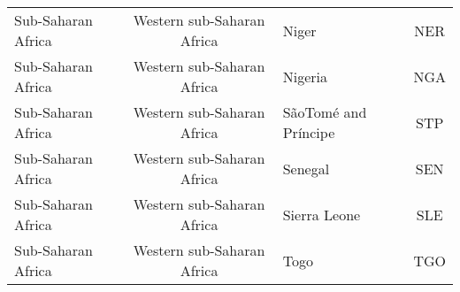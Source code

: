 \begin{landscape}
\begin{longtable}{|p{6cm}|c|p{5cm}|c|}
                               Sub-Saharan Africa &   Western sub-Saharan Africa &                                             Niger &  NER \\
                               Sub-Saharan Africa &   Western sub-Saharan Africa &                                           Nigeria &  NGA \\
                               Sub-Saharan Africa &   Western sub-Saharan Africa &                         S\~aoTom\'e and Pr\'incipe &  STP \\
                               Sub-Saharan Africa &   Western sub-Saharan Africa &                                           Senegal &  SEN \\
                               Sub-Saharan Africa &   Western sub-Saharan Africa &                                      Sierra Leone &  SLE \\
                               Sub-Saharan Africa &   Western sub-Saharan Africa &                                              Togo &  TGO \\
\hline
\end{longtable}
\end{landscape} 
